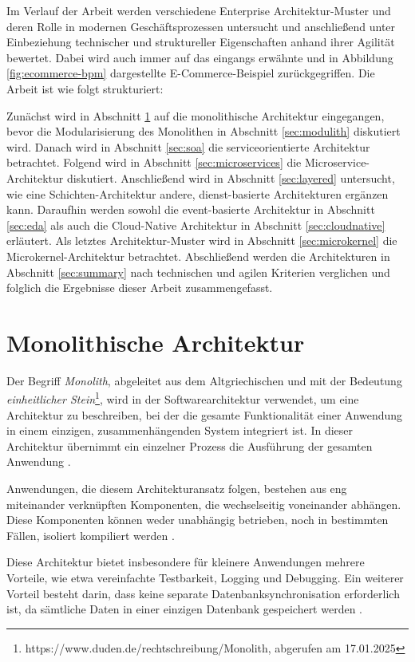 \documentclass[acmtog]{acmart}
\begin{document}
Im Verlauf der Arbeit werden verschiedene Enterprise Architektur-Muster und deren Rolle in modernen Geschäftsprozessen untersucht
und anschließend unter Einbeziehung technischer und struktureller Eigenschaften anhand ihrer Agilität bewertet.
Dabei wird auch immer auf das eingangs erwähnte und in Abbildung \ref{fig:ecommerce-bpm} dargestellte E-Commerce-Beispiel zurückgegriffen.
Die Arbeit ist wie folgt strukturiert:

Zunächst wird in Abschnitt \ref{sec:monolith} auf die monolithische Architektur eingegangen, bevor die Modularisierung des Monolithen in Abschnitt \ref{sec:modulith} diskutiert wird.
Danach wird in Abschnitt \ref{sec:soa} die serviceorientierte Architektur betrachtet.
Folgend wird in Abschnitt \ref{sec:microservices} die Microservice-Architektur diskutiert.
Anschließend wird in Abschnitt \ref{sec:layered} untersucht, wie eine Schichten-Architektur andere, dienst-basierte Architekturen ergänzen kann.
Daraufhin werden sowohl die event-basierte Architektur in Abschnitt \ref{sec:eda} als auch die Cloud-Native Architektur in Abschnitt \ref{sec:cloudnative} erläutert.
Als letztes Architektur-Muster wird in Abschnitt \ref{sec:microkernel} die Microkernel-Architektur betrachtet.
Abschließend werden die Architekturen in Abschnitt \ref{sec:summary} nach technischen und agilen Kriterien verglichen und folglich die Ergebnisse dieser Arbeit zusammengefasst.

\section{Monolithische Architektur}
\label{sec:monolith}
Der Begriff \textit{Monolith}, abgeleitet aus dem Altgriechischen und mit der Bedeutung
\textit{einheitlicher Stein}\footnote{https://www.duden.de/rechtschreibung/Monolith, abgerufen am 17.01.2025},
wird in der Softwarearchitektur verwendet, um eine Architektur zu beschreiben, bei der die gesamte Funktionalität
einer Anwendung in einem einzigen, zusammenhängenden System integriert ist.
In dieser Architektur übernimmt ein einzelner Prozess die Ausführung der gesamten Anwendung \cite[1]{mono}.

Anwendungen, die diesem Architekturansatz folgen, bestehen aus eng miteinander verknüpften
Komponenten, die wechselseitig voneinander abhängen.
Diese Komponenten können weder unabhängig betrieben, noch in bestimmten Fällen,
isoliert kompiliert werden \cite[485]{mono3}.

Diese Architektur bietet insbesondere für kleinere Anwendungen mehrere Vorteile,
wie etwa vereinfachte Testbarkeit, Logging und Debugging. Ein
weiterer Vorteil besteht darin, dass keine separate Datenbanksynchronisation
erforderlich ist, da sämtliche Daten in einer einzigen Datenbank gespeichert
werden \cite[20358]{mono4}.
\end{document}
